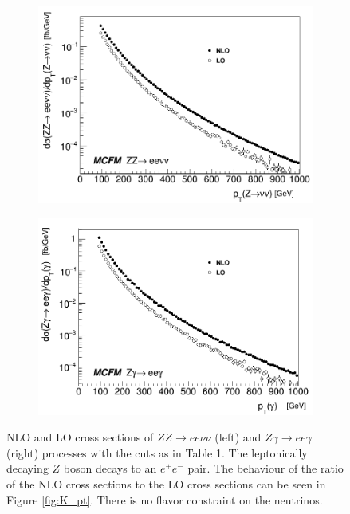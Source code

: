 \documentclass[12pt,a4paper,openright,twoside]{report}
\begin{document}
\begin{figure}[H]
\centering
	\begin{subfigure}{0.49\textwidth}
		\includegraphics[width=\linewidth]{ZZ_xsec.png}
		\caption{}
		\label{subfig:ZeeZvv}
	\end{subfigure}	
	\begin{subfigure}{0.49\textwidth}
		\includegraphics[width=\linewidth]{Zg_xsec.png}
		\caption{}
		\label{subfig:Zeeg}	
	\end{subfigure}
	\caption{NLO and LO cross sections of $ZZ\to ee\nu\nu$ (left) and $Z\gamma\to ee\gamma$ (right) processes with the cuts as in Table 1. The leptonically decaying $Z$ boson decays to an $e^+e^-$ pair. The behaviour of the ratio of the NLO cross sections to the LO cross sections can be seen in Figure \ref{fig:K_pt}. There is no flavor constraint on the neutrinos.}
	\label{fig:xsecs}
\end{figure}
\end{document}
